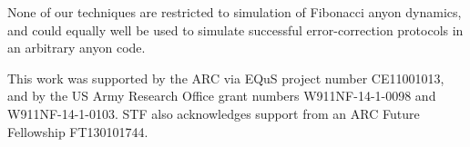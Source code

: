 \documentclass[aps, prl, letterpaper, twocolumn, superscriptaddress, notitlepage, 10pt]{revtex4-1}
\begin{document}
	None of our techniques are restricted to simulation of Fibonacci anyon dynamics, and could equally well be used to simulate successful error-correction protocols in an arbitrary anyon code.	
	




\acknowledgements 

 This work was supported by the ARC via EQuS project number CE11001013, and by the US Army Research Office grant numbers W911NF-14-1-0098 and W911NF-14-1-0103. STF also acknowledges support from an ARC Future Fellowship FT130101744. 

%

\end{document}
